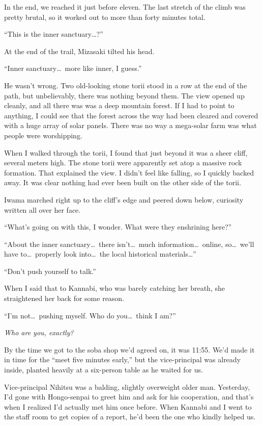 \documentclass[
    a4paper,
    12pt,
    twoside,
    openany,
    UTF8,
    fontset=windows
]{ctexbook}
\begin{document}
In the end, we reached it just before eleven. The last stretch of the climb was pretty brutal, so it worked out to more than forty minutes total.

``This is the inner sanctuary\dots?''

At the end of the trail, Mizasaki tilted his head.

``Inner sanctuary\dots\ more like inner, I guess.''

He wasn't wrong. Two old-looking stone torii stood in a row at the end of the path, but unbelievably, there was nothing beyond them. The view opened up cleanly, and all there was was a deep mountain forest. If I had to point to anything, I could see that the forest across the way had been cleared and covered with a huge array of solar panels. There was no way a mega-solar farm was what people were worshipping.

When I walked through the torii, I found that just beyond it was a sheer cliff, several meters high. The stone torii were apparently set atop a massive rock formation. That explained the view. I didn't feel like falling, so I quickly backed away. It was clear nothing had ever been built on the other side of the torii.

Iwama marched right up to the cliff's edge and peered down below, curiosity written all over her face.

``What's going on with this, I wonder. What were they enshrining here?''

``About the inner sanctuary\dots\ there isn't\dots\ much information\dots\ online, so\dots\ we'll have to\dots\ properly look into\dots\ the local historical materials\dots''

``Don't push yourself to talk.''

When I said that to Kannabi, who was barely catching her breath, she straightened her back for some reason.

``I'm not\dots\ pushing myself. Who do you\dots\ think I am?''

\textit{Who are you, exactly?}

By the time we got to the soba shop we'd agreed on, it was 11:55. We'd made it in time for the ``meet five minutes early,'' but the vice-principal was already inside, planted heavily at a six-person table as he waited for us.

Vice-principal Nihitsu was a balding, slightly overweight older man. Yesterday, I'd gone with Hongo-senpai to greet him and ask for his cooperation, and that's when I realized I'd actually met him once before. When Kannabi and I went to the staff room to get copies of a report, he'd been the one who kindly helped us.
\end{document}
